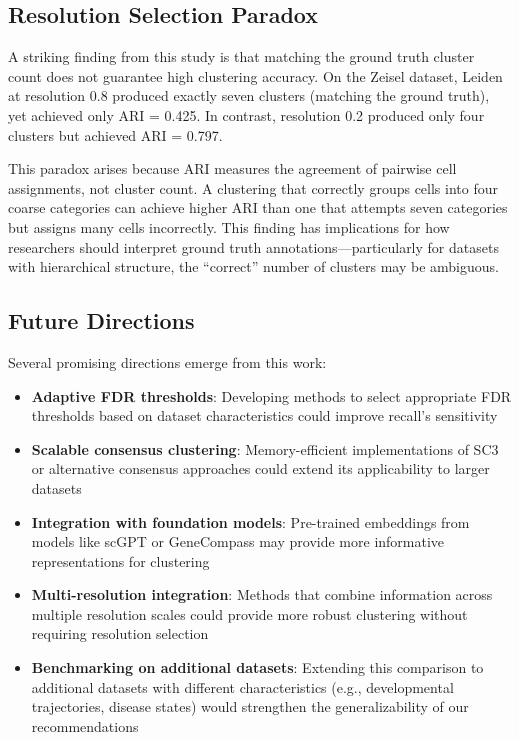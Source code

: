 \subsection{Resolution Selection Paradox}

A striking finding from this study is that matching the ground truth cluster count does not guarantee high clustering accuracy. On the Zeisel dataset, Leiden at resolution 0.8 produced exactly seven clusters (matching the ground truth), yet achieved only ARI = 0.425. In contrast, resolution 0.2 produced only four clusters but achieved ARI = 0.797.

This paradox arises because ARI measures the agreement of pairwise cell assignments, not cluster count. A clustering that correctly groups cells into four coarse categories can achieve higher ARI than one that attempts seven categories but assigns many cells incorrectly. This finding has implications for how researchers should interpret ground truth annotations---particularly for datasets with hierarchical structure, the ``correct'' number of clusters may be ambiguous.

\subsection{Future Directions}

Several promising directions emerge from this work:

\begin{itemize}[noitemsep]
    \item \textbf{Adaptive FDR thresholds}: Developing methods to select appropriate FDR thresholds based on dataset characteristics could improve recall's sensitivity

    \item \textbf{Scalable consensus clustering}: Memory-efficient implementations of SC3 or alternative consensus approaches could extend its applicability to larger datasets

    \item \textbf{Integration with foundation models}: Pre-trained embeddings from models like scGPT or GeneCompass may provide more informative representations for clustering

    \item \textbf{Multi-resolution integration}: Methods that combine information across multiple resolution scales could provide more robust clustering without requiring resolution selection

    \item \textbf{Benchmarking on additional datasets}: Extending this comparison to additional datasets with different characteristics (e.g., developmental trajectories, disease states) would strengthen the generalizability of our recommendations
\end{itemize}

